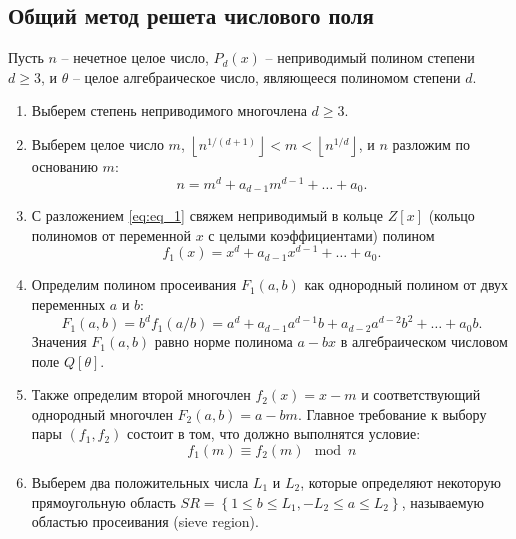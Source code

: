 \documentclass[a4paper,12pt]{article}
\begin{document}
\subsection{Общий метод решета числового поля}

Пусть $n$ -- нечетное целое число, $P_d(x)$ -- неприводимый полином степени $d \geq 3$, и
$\theta$ -- целое алгебраическое число, являющееся полиномом степени $d$.

\begin{enumerate}
    \item Выберем степень неприводимого многочлена $d \geq 3$.

    \item Выберем целое число $m$,
          $\left \lfloor n^{1/(d+1)} \right \rfloor < m < \left \lfloor n^{1/d} \right \rfloor$, и $n$ разложим по основанию $m$:
        \begin{equation} \label{eq:eq_1}
          n = m^d + a_{d-1}m^{d-1} + \ldots + a_0.
        \end{equation}

    \item С разложением \ref{eq:eq_1} свяжем неприводимый в кольце $Z[x]$
    (кольцо полиномов от переменной $x$ с целыми коэффициентами) полином
    \begin{equation} \label{eq:eq_2}
        f_1(x) = x^d + a_{d-1}x^{d-1} + \ldots + a_0.
    \end{equation}

    \item Определим полином просеивания $F_1(a, b)$ как однородный полином
    от двух переменных $a$ и $b$:
    \begin{equation} \label{eq:eq_3}
        F_1(a, b) = b^d f_1(a / b) = a^d + a_{d - 1}a^{d -1}b
        + a_{d - 2} a^{d-2}b^2 + \ldots + a_0b.
    \end{equation}
    Значения $F_1(a, b)$ равно норме полинома $a - bx$ в алгебраическом числовом
    поле $Q[\theta]$.

    \item Также определим второй многочлен $f_2(x) = x - m$ и соответствующий
    однородный многочлен $F_2(a, b) = a - bm$. Главное требование к выбору
    пары $(f_1, f_2)$ состоит в том, что должно выполнятся условие:
    \begin{equation} \label{eq:eq_4}
        f_1(m) \equiv f_2(m) \mod n
    \end{equation}

    \item Выберем два положительных числа $L_1$ и $L_2$, которые определяют некоторую
    прямоугольную область $SR = \left \{1 \leq b \leq L_1, -L_2 \leq a \leq L_2 \right \}$,
    называемую областью просеивания (sieve region).


\end{enumerate}
\end{document}
